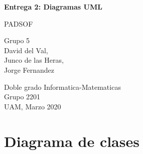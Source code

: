 \documentclass[12pt]{article}
\begin{document}
 

\begin{titlepage}
    \begin{center}
        \vspace*{1cm}
 
        \Huge
        \textbf{Entrega 2: Diagramas UML}
 
        \vspace{0.5cm}
        \LARGE
        PADSOF
 
        \vspace{1.5cm}
 
        \Large
        Grupo 5\\
        David del Val,\\
        Junco de las Heras,\\
        Jorge Fernandez
         
 
        \vfill
 
 
        \vspace{0.8cm}
 
 
        \Large
        Doble grado Informatica-Matematicas\\
        Grupo 2201\\
        UAM, Marzo 2020
 
    \end{center}
\end{titlepage}


\section{Diagrama de clases}
\end{document}
